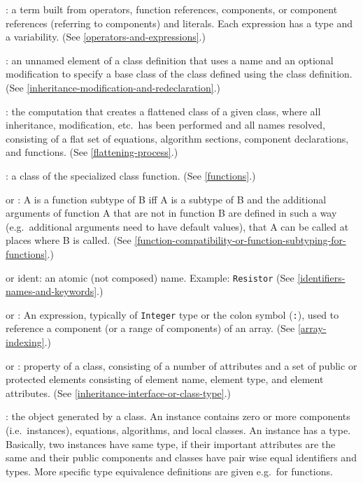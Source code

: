 : a term built from operators, function references,
components, or component references (referring to components) and
literals. Each expression has a type and a variability. (See \cref{operators-and-expressions}.)

: an unnamed element of a class definition that
uses a name and an optional modification to specify a base class of the
class defined using the class definition. (See \cref{inheritance-modification-and-redeclaration}.)

: the computation that creates a flattened class of a
given class, where all inheritance, modification, etc.\ has been
performed and all names resolved, consisting of a flat set of equations,
algorithm sections, component declarations, and functions. (See \cref{flattening-process}.)

: a class of the specialized class function. (See \cref{functions}.)

 or : A
is a function subtype of B iff A is a subtype of B and the additional
arguments of function A that are not in function B are defined in such a
way (e.g.\ additional arguments need to have default values), that A can
be called at places where B is called. (See \cref{function-compatibility-or-function-subtyping-for-functions}.)

 or ident: an atomic (not composed) name. Example:
\lstinline!Resistor! (See \cref{identifiers-names-and-keywords}.)

 or : An expression, typically of \lstinline!Integer! type or the colon symbol (\lstinline!:!), used to reference a component (or a range of components) of an array.  (See \cref{array-indexing}.)

 or : property of a
class, consisting of a number of attributes and a set of public or
protected elements consisting of element name, element type, and element
attributes. (See \cref{inheritance-interface-or-class-type}.)

: the object generated by a class. An instance contains
zero or more components (i.e.\ instances), equations, algorithms, and
local classes. An instance has a type. Basically, two instances have
same type, if their important attributes are the same and their public
components and classes have pair wise equal identifiers and types. More
specific type equivalence definitions are given e.g.\ for functions.

